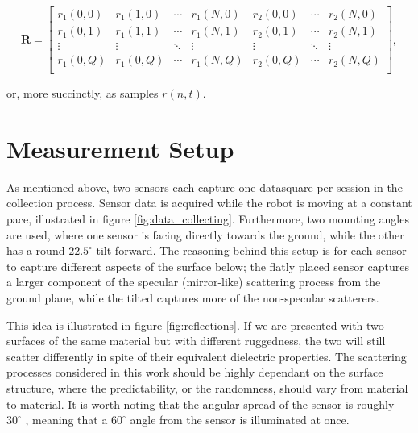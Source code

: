 \begin{equation}
	\mathbf{R}= 
	\begin{bmatrix}
		r_1(0,0) & r_1(1,0) & \cdots & r_1(N,0) & r_2(0,0) & \cdots & r_2(N,0) \\
		r_1(0,1) & r_1(1,1) & \cdots & r_1(N,1) & r_2(0,1) & \cdots & r_2(N,1) \\
		\vdots &  \vdots & \ddots & \vdots & \vdots & \ddots &  \vdots \\
		r_1(0,Q) & r_1(0,Q) & \cdots  & r_1(N,Q) & r_2(0,Q) & \cdots  & r_2(N,Q) \\
	\end{bmatrix}
	,
\end{equation}

or, more succinctly, as samples $r(n,t)$.

\section{Measurement Setup}



As mentioned above, two sensors each capture one datasquare per session in the collection process. Sensor data is acquired while the robot is moving at a constant pace, illustrated in figure \ref{fig:data_collecting}. Furthermore, two mounting angles are used, where one sensor is facing directly towards the ground, while the other has a round $22.5^\circ$ tilt forward. The reasoning behind this setup is for each sensor to capture different aspects of the surface below; the flatly placed sensor captures a larger component of the specular (mirror-like) scattering process from the ground plane, while the tilted captures more of the non-specular scatterers. 

This idea is illustrated in figure \ref{fig:reflections}. If we are presented with two surfaces of the same material but with different ruggedness, the two will still scatter differently in spite of their equivalent dielectric properties. The scattering processes considered in this work should be highly dependant on the surface structure, where the predictability, or the randomness, should vary from material to material. It is worth noting that the angular spread of the sensor is roughly $30^\circ$ \citep{acconeer_datasheet_a111}, meaning that a $60^\circ$ angle from the sensor is illuminated at once. 

